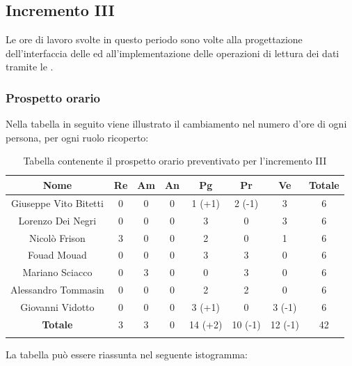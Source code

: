 		
		\subsection{Incremento III }
		Le ore di lavoro svolte in questo periodo sono volte alla progettazione dell'interfaccia delle  ed all'implementazione delle operazioni di lettura dei dati tramite le .
		\subsubsection{Prospetto orario}
			Nella tabella in seguito viene illustrato il cambiamento nel numero d'ore di ogni persona, per ogni ruolo ricoperto:
			
			\begin{longtable}{|c|c|c|c|c|c|c|c}
				\hline
				\rowcolor{lighter-grayer}
				\textbf{Nome} & \textbf{Re} & \textbf{Am} & \textbf{An} & \textbf{Pg}  & \textbf{Pr}   & \textbf{Ve} & \textbf{Totale} \\
				\hline
				\endfirsthead
				\hline
				Giuseppe Vito Bitetti & 0 & 0 & 0 & 1 (+1) & 2 (-1) & 3 & 6\\
				\hline
				\hline
				Lorenzo Dei Negri & 0 & 0 & 0 & 3 & 0 & 3 & 6\\
				\hline
				\hline
				Nicolò Frison & 3 & 0 & 0 & 2 & 0 & 1 & 6 \\
				\hline
				\hline
				Fouad Mouad & 0 & 0 & 0 & 3 & 3 & 0 & 6\\
				\hline
				\hline
				Mariano Sciacco & 0 & 3 & 0 & 0 & 3 & 0 & 6 \\
				\hline
				\hline
				Alessandro Tommasin & 0 & 0 & 0 & 2 & 2 & 0 & 6\\
				\hline
				\hline
				Giovanni Vidotto & 0 & 0 & 0 & 3 (+1) & 0 & 3 (-1) & 6 \\
				\hline 
				\textbf{Totale} & 3 &  3 & 0 & 14 (+2) & 10 (-1) & 12 (-1) & 42 \\
				\hline 
				
				\caption{Tabella contenente il prospetto orario preventivato per l'incremento III}
			\end{longtable}
			
			La tabella può essere riassunta nel seguente istogramma:
			
